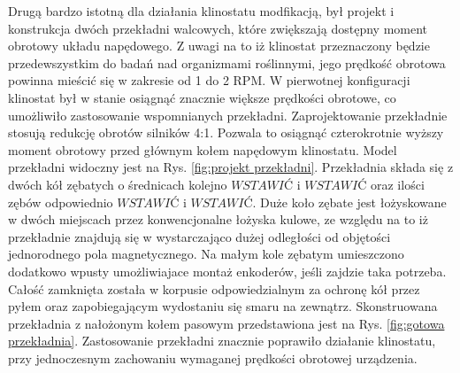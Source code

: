 Drugą bardzo istotną dla działania klinostatu modfikacją, był projekt i konstrukcja dwóch
 przekładni walcowych, które zwiększają dostępny moment obrotowy układu napędowego. Z uwagi na
  to iż klinostat przeznaczony będzie przedewszystkim do badań nad organizmami roślinnymi, jego
   prędkość obrotowa powinna mieścić się w zakresie od 1 do 2 RPM. W pierwotnej konfiguracji
    klinostat był w stanie osiągnąć znacznie większe prędkości obrotowe, co umożliwiło
     zastosowanie wspomnianych przekładni. Zaprojektowanie przekładnie stosują redukcję obrotów
      silników 4:1. Pozwala to osiągnąć czterokrotnie wyższy moment obrotowy przed głównym kołem
       napędowym klinostatu. Model przekładni widoczny jest na Rys. \ref{fig:projekt
       	 przekładni}. Przekładnia składa się z dwóch kół zębatych o średnicach kolejno $WSTAWIĆ$
         i $WSTAWIĆ$ oraz ilości zębów odpowiednio $WSTAWIĆ$ i $WSTAWIĆ$. Duże koło zębate jest
          łożyskowane w dwóch miejscach przez konwencjonalne łożyska kulowe, ze względu na to iż
           przekładnie znajdują się w wystarczająco dużej odległości od objętości jednorodnego
            pola magnetycznego. Na małym kole zębatym umieszczono dodatkowo wpusty umożliwiajace
             montaż enkoderów, jeśli zajdzie taka potrzeba. Całość zamknięta została w korpusie
              odpowiedzialnym za ochronę kół przez pyłem oraz zapobiegającym wydostaniu się
               smaru na zewnątrz. Skonstruowana przekładnia z nałożonym kołem pasowym
                przedstawiona jest na Rys. \ref{fig:gotowa przekładnia}. Zastosowanie przekładni
                 znacznie poprawiło działanie klinostatu, przy jednoczesnym zachowaniu wymaganej
                  prędkości obrotowej urządzenia.       


